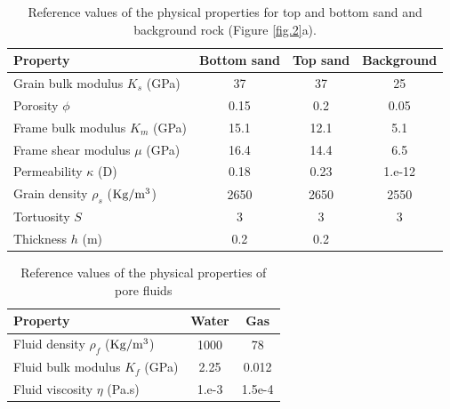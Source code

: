 \documentclass[draft]{agujournal2019}
\begin{document}
\begin{table}[!ht]
  \caption{Reference values of the physical properties for top and bottom sand and background rock (Figure \ref{fig.2}a). }
\begin{center}
  \begin{tabular}{ | l  c  c c | }
    \hline
    Property & Bottom sand & Top sand & Background  \\ \hline
    Grain bulk modulus $K_s$ (\rm{GPa}) & 37 & 37 & 25 \\ 
    Porosity $\phi$ & 0.15 & 0.2 & 0.05  \\ 
    Frame bulk modulus $K_m$ (GPa) & 15.1  & 12.1 & 5.1\\ 
    Frame shear modulus $\mu$ (GPa) & 16.4  & 14.4 & 6.5 \\
    Permeability $\kappa$ (D) & 0.18 & 0.23 & 1.e-12 \\
    Grain density $\rho_s$ ($\rm{Kg/m^3}$) &2650 & 2650 & 2550\\ 
    Tortuosity $S$ & 3 & 3 & 3\\
    Thickness $h$ (m) & 0.2 & 0.2 & \\ 
                                       
    \hline
  \end{tabular}
  \label{table.1}
\end{center}
\end{table}

\begin{table}[!ht]
  \caption{Reference values of the physical properties of pore fluids}
\begin{center}
  \begin{tabular}{ | l | c | c |  }
    \hline
    Property & Water & Gas\\ \hline
    Fluid density $\rho_f$ ($\rm{Kg/m^3}$) & 1000 & 78\\
    Fluid bulk modulus $K_f$ (\rm{GPa}) & 2.25 & 0.012\\
    Fluid viscosity $\eta$ (\rm{Pa.s})& 1.e-3 & 1.5e-4\\
    \hline
  \end{tabular}
  \label{table.2}
\end{center}
\end{table}
\end{document}
